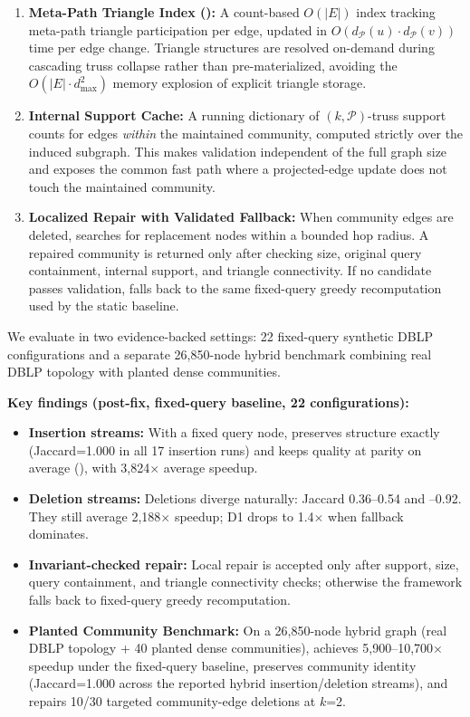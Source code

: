 \begin{enumerate}
\item \textbf{Meta-Path Triangle Index (\mtindex):} A count-based $O(|E|)$ index tracking meta-path triangle participation per edge, updated in $O(d_{\mathcal{P}}(u)\cdot d_{\mathcal{P}}(v))$ time per edge change. Triangle structures are resolved on-demand during cascading truss collapse rather than pre-materialized, avoiding the $O(|E|\cdot d_{\max}^2)$ memory explosion of explicit triangle storage.

\item \textbf{Internal Support Cache:} A running dictionary of $(k,\mathcal{P})$-truss support counts for edges \emph{within} the maintained community, computed strictly over the induced subgraph. This makes validation independent of the full graph size and exposes the common fast path where a projected-edge update does not touch the maintained community.

\item \textbf{Localized Repair with Validated Fallback:} When community edges are deleted, \DynaSCSH searches for replacement nodes within a bounded hop radius. A repaired community is returned only after checking size, original query containment, internal support, and triangle connectivity. If no candidate passes validation, \DynaSCSH falls back to the same fixed-query greedy recomputation used by the static baseline.
\end{enumerate}

We evaluate \DynaSCSH in two evidence-backed settings: 22 fixed-query synthetic DBLP configurations and a separate 26,850-node hybrid benchmark combining real DBLP topology with planted dense communities.

\textbf{Key findings (post-fix, fixed-query baseline, 22 configurations):}
\begin{itemize}
\item \textbf{Insertion streams:} With a fixed query node, \DynaSCSH preserves structure exactly (Jaccard=1.000 in all 17 insertion runs) and keeps quality at parity on average (), with 3,824$\times$ average speedup.
\item \textbf{Deletion streams:} Deletions diverge naturally: Jaccard 0.36--0.54 and --0.92. They still average 2,188$\times$ speedup; D1 drops to 1.4$\times$ when fallback dominates.
\item \textbf{Invariant-checked repair:} Local repair is accepted only after support, size, query containment, and triangle connectivity checks; otherwise the framework falls back to fixed-query greedy recomputation.
\item \textbf{Planted Community Benchmark:} On a 26,850-node hybrid graph (real DBLP topology + 40 planted dense communities), \DynaSCSH achieves 5,900--10,700$\times$ speedup under the fixed-query baseline, preserves community identity (Jaccard=1.000 across the reported hybrid insertion/deletion streams), and repairs 10/30 targeted community-edge deletions at $k$=2.
\end{itemize}

